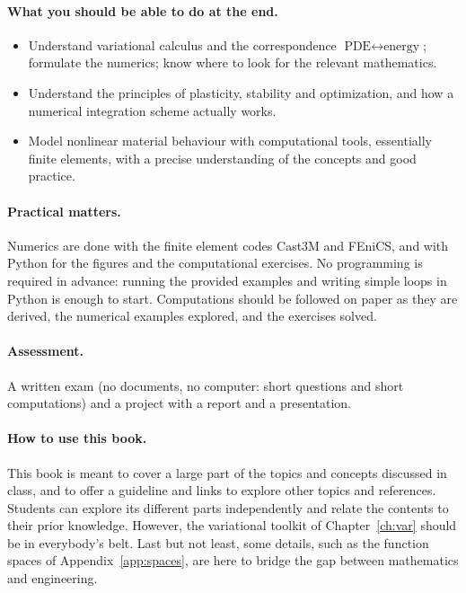 \paragraph{What you should be able to do at the end.}
\begin{itemize}[itemsep=2pt]
  \item Understand variational calculus and the correspondence
  $\text{PDE}\leftrightarrow\text{energy}$; formulate the numerics; know where
  to look for the relevant mathematics.
  \item Understand the principles of plasticity, stability and optimization,
  and how a numerical integration scheme actually works.
  \item Model nonlinear material behaviour with computational tools,
  essentially finite elements, with a precise understanding of the concepts
  and good practice.
\end{itemize}

\paragraph{Practical matters.}
Numerics are done with the finite element codes Cast3M and FEniCS, and
with Python for the figures and the computational exercises. No programming is required
in advance: running the provided examples and writing simple loops in Python
is enough to start. Computations should be followed on paper as they are
derived, the numerical examples explored, and the exercises solved.

\paragraph{Assessment.}
A written exam (no documents, no computer: short questions and short
computations) and a project with a report and a presentation.

\paragraph{How to use this book.}
This book is meant to cover a large part of the topics and concepts
discussed in class, and to offer a guideline and links to explore other
topics and references. Students can explore its different parts
independently and relate the contents to their prior knowledge. However, the
variational toolkit of Chapter~\ref{ch:var} should be in everybody's belt.
Last but not least, some details, such as the function spaces of
Appendix~\ref{app:spaces}, are here to bridge the gap between mathematics
and engineering.

\cleardoublepage
